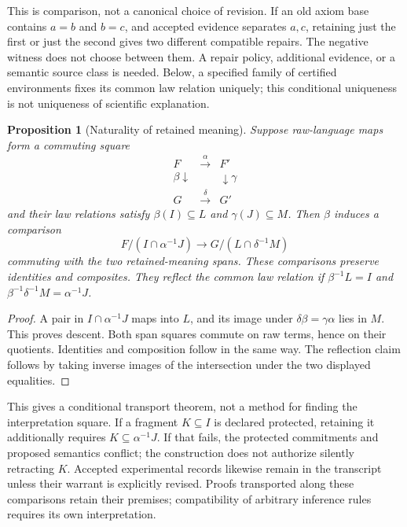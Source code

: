 \documentclass[11pt]{article}
\newtheorem{proposition}[theorem]{Proposition}
\theoremstyle{definition}
\theoremstyle{remark}\newtheorem{remark}[theorem]{Remark}
\begin{document}
This is comparison, not a canonical choice of revision. If an old axiom
base contains $a=b$ and $b=c$, and accepted evidence separates $a,c$,
retaining just the first or just the second gives two different compatible
repairs. The negative witness does not choose between them. A repair policy,
additional evidence, or a semantic source class is needed. Below, a specified
family of certified environments fixes its common law relation uniquely;
this conditional uniqueness is not uniqueness of scientific explanation.

\begin{proposition}[Naturality of retained meaning]\label{prop:naturality}
Suppose raw-language maps form a commuting square
\[
\begin{array}{ccc}
F&\xrightarrow{\alpha}&F'\\
{\scriptstyle\beta}\downarrow&&\downarrow{\scriptstyle\gamma}\\
G&\xrightarrow{\delta}&G'
\end{array}
\]
and their law relations satisfy $\beta(I)\subseteq L$ and
$\gamma(J)\subseteq M$. Then $\beta$ induces a comparison
\[
 F/(I\cap\alpha^{-1}J)\longrightarrow
 G/(L\cap\delta^{-1}M)
\]
commuting with the two retained-meaning spans. These comparisons preserve
identities and composites. They reflect the common law relation if
$\beta^{-1}L=I$ and $\beta^{-1}\delta^{-1}M=\alpha^{-1}J$.
\end{proposition}
\begin{proof}
A pair in $I\cap\alpha^{-1}J$ maps into $L$, and its image under
$\delta\beta=\gamma\alpha$ lies in $M$. This proves descent. Both span
squares commute on raw terms, hence on their quotients. Identities and
composition follow in the same way. The reflection claim follows by taking
inverse images of the intersection under the two displayed equalities.
\end{proof}
This gives a conditional transport theorem, not a method for finding the
interpretation square. If a fragment $K\subseteq I$ is declared protected,
retaining it additionally requires $K\subseteq\alpha^{-1}J$. If that fails,
the protected commitments and proposed semantics conflict; the construction
does not authorize silently retracting $K$. Accepted experimental records
likewise remain in the transcript unless their warrant is explicitly
revised. Proofs transported along these comparisons retain their premises;
compatibility of arbitrary inference rules requires its own interpretation.
\end{document}
